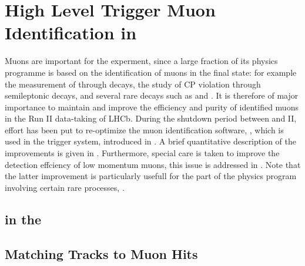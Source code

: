 \chapter{High Level Trigger Muon Identification in \runtwo}
\label{Muon_id_hlt}

Muons are important for the \lhcb experment, since a large fraction of its physics programme is based on
the identification of muons in the final state: for example the measurement of \phis through \BsJpsiPhi decays,
the study of CP violation through semileptonic decays, and several rare decays such as \BdKstmumu and \Bsmm.
It is therefore of major importance to maintain and improve the efficiency and purity of identified muons in
the Run II data-taking of LHCb. During the shutdown period between \runone and II, effort has been put to
re-optimize the muon identification software, \muonID, which is used in the \lhcb trigger system, introduced in .
A brief quantitative description of the \muonID improvements is given in .
Furthermore, special care is taken to improve the detection effciency of low momentum muons, this issue is
addressed in . Note that the latter improvement is particularly usefull for the part
of the \lhcb physics program involving certain rare processes, \eg \cite{LHCB-CONF-2016-013-001,LHCb-CONF-2016-012}.

\section{\hltone \muonID in the \lhc \runtwo}
\label{muid_hlt1}


\section{Matching \velo Tracks to Muon Hits}
\label{mvm_algorrithm}

